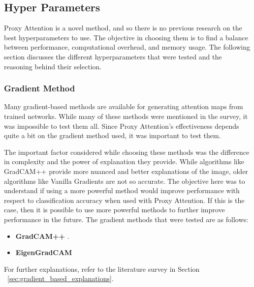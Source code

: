 \subsection{Hyper Parameters} \label{sec:hyperparameters}
Proxy Attention is a novel method, and so there is no previous research on the best hyperparameters to use. The objective in choosing them is to find a balance between performance, computational overhead, and memory usage. The following section discusses the different hyperparameters that were tested and the reasoning behind their selection.

\subsubsection{Gradient Method}
Many gradient-based methods are available for generating attention maps from trained networks. While many of these methods were mentioned in the survey, it was impossible to test them all. Since Proxy Attention's effectiveness depends quite a bit on the gradient method used, it was important to test them.

The important factor considered while choosing these methods was the difference in complexity and the power of explanation they provide. While algorithms like GradCAM++ \cite{chattopadhayGradCAMGeneralizedGradientBased2018} provide more nuanced and better explanations of the image, older algorithms like Vanilla Gradients \cite{zeilerVisualizingUnderstandingConvolutional2013} are not so accurate. The objective here was to understand if using a more powerful method would improve performance with respect to classification accuracy when used with Proxy Attention. If this is the case, then it is possible to use more powerful methods to further improve performance in the future.
The gradient methods that were tested are as follows:
\begin{itemize}
    \item \textbf{GradCAM++} \cite{chattopadhayGradCAMGeneralizedGradientBased2018}.
    \item \textbf{EigenGradCAM} \cite{banymuhammadEigenCAMVisualExplanations2021}
\end{itemize}
For further explanations, refer to the literature survey in Section ~\ref{sec:gradient_based_explanations}.

